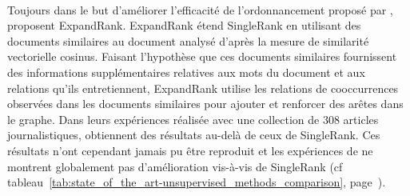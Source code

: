         ~\\Toujours dans le but d'améliorer l'efficacité de l'ordonnancement
        proposé par , 
        proposent ExpandRank. ExpandRank étend SingleRank en utilisant des
        documents similaires au document analysé d'après la mesure de similarité
        vectorielle cosinus. Faisant l'hypothèse que ces documents similaires
        fournissent des informations supplémentaires relatives aux mots du
        document et aux relations qu'ils entretiennent, ExpandRank utilise les
        relations de cooccurrences observées dans les documents similaires pour
        ajouter et renforcer des arêtes dans le graphe. Dans leurs expériences
        réalisée avec une collection de 308 articles journalistiques,
         obtiennent des résultats au-delà de ceux de
        SingleRank. Ces résultats n'ont cependant jamais pu être reproduit et
        les expériences de  ne montrent
        globalement pas d'amélioration vis-à-vis de SingleRank (cf
        tableau~\ref{tab:state_of_the_art-unsupervised_methods_comparison},
        page~\pageref{tab:state_of_the_art-unsupervised_methods_comparison}).

